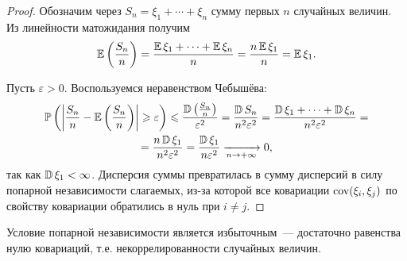 \begin{proof}
    Обозначим через $S_n = \xi_1 + \cdots + \xi_n$ сумму первых $n$ случайных величин. Из линейности матожидания получим
    \begin{equation*}
        \operatorname{\mathbb{E}} \left(\frac{S_{n}}{n}\right)=\frac{\operatorname{\mathbb{E}} \xi_{1}+\cdots+\operatorname{\mathbb{E}} \xi_{n}}{n}=\frac{n \operatorname{\mathbb{E}} \xi_{1}}{n}=\operatorname{\mathbb{E}} \xi_{1}.
    \end{equation*}
    
    Пусть $\varepsilon > 0.$ Воспользуемся неравенством Чебышёва:
    \begin{multline*}
        \operatorname{\mathbb{P}}\left(\left|\frac{S_{n}}{n}-\operatorname{\mathbb{E}} \left(\frac{S_{n}}{n}\right)\right| \geqslant \varepsilon\right) \leqslant \frac{\operatorname{\mathbb{D}}\left(\frac{S_{n}}{n}\right)}{\varepsilon^{2}}
        = \frac{\operatorname{\mathbb{D}} S_{n}}{n^{2} \varepsilon^{2}}
        = \frac{\operatorname{\mathbb{D}} \xi_{1}+\cdots+\operatorname{\mathbb{D}} \xi_{n}}{n^{2} \varepsilon^{2}}= \\
        = \frac{n \operatorname{\mathbb{D}} \xi_{1}}{n^{2} \varepsilon^{2}}
        = \frac{\operatorname{\mathbb{D}} \xi_{1}}{n \varepsilon^{2}} \xrightarrow[n \to +\infty]{} 0,
    \end{multline*}
    так как $\operatorname{\mathbb{D}}\xi_1 < \infty$. Дисперсия суммы превратилась в сумму дисперсий в силу попарной независимости слагаемых, из-за которой все ковариации $\operatorname{cov}(\xi_i, \xi_j)$ по свойству ковариации обратились в нуль при $i \neq j$.
\end{proof}

\begin{rmrk}
    Условие попарной независимости является избыточным~--- достаточно равенства нулю ковариаций, т.е. некоррелированности случайных величин.
\end{rmrk}
